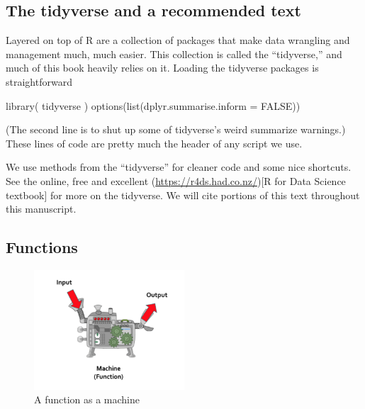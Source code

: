 \documentclass[
]{book}
\newenvironment{Shaded}{\begin{snugshade}}{\end{snugshade}}
\newcommand{\AttributeTok}[1]{\textcolor[rgb]{0.77,0.63,0.00}{#1}}
\newcommand{\ConstantTok}[1]{\textcolor[rgb]{0.00,0.00,0.00}{#1}}
\newcommand{\FunctionTok}[1]{\textcolor[rgb]{0.00,0.00,0.00}{#1}}
\newcommand{\NormalTok}[1]{#1}
\begin{document}
\hypertarget{the-tidyverse-and-a-recommended-text}{%
\subsection{The tidyverse and a recommended text}\label{the-tidyverse-and-a-recommended-text}}

Layered on top of R are a collection of packages that make data wrangling and management much, much easier.
This collection is called the ``tidyverse,'' and much of this book heavily relies on it.
Loading the tidyverse packages is straightforward

\begin{Shaded}
\begin{Highlighting}[]
\FunctionTok{library}\NormalTok{( tidyverse )}
\FunctionTok{options}\NormalTok{(}\FunctionTok{list}\NormalTok{(}\AttributeTok{dplyr.summarise.inform =} \ConstantTok{FALSE}\NormalTok{))}
\end{Highlighting}
\end{Shaded}

(The second line is to shut up some of tidyverse's weird summarize warnings.)
These lines of code are pretty much the header of any script we use.

We use methods from the ``tidyverse'' for cleaner code and some nice shortcuts.
See the online, free and excellent (\url{https://r4ds.had.co.nz/}){[}R for Data Science textbook{]} for more on the tidyverse.
We will cite portions of this text throughout this manuscript.

\hypertarget{functions}{%
\subsection{Functions}\label{functions}}

\begin{figure}
\centering
\includegraphics[width=0.5\textwidth,height=\textheight]{image/function-machine.png}
\caption{A function as a machine}
\end{figure}
\end{document}
